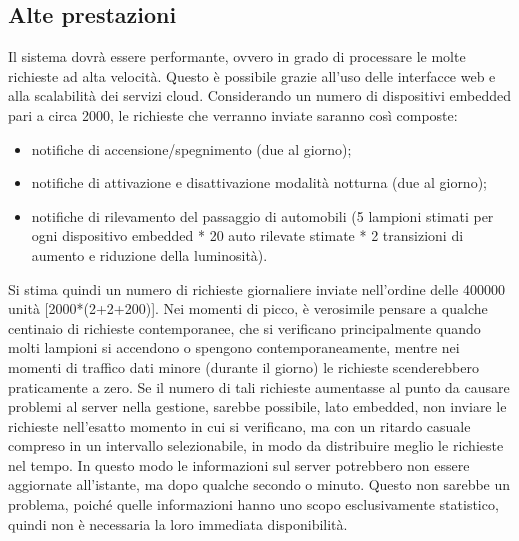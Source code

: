 \subsection{Alte prestazioni}
Il sistema dovrà essere performante, ovvero in grado di processare le molte richieste ad alta velocità. Questo è possibile grazie all'uso delle interfacce web e alla scalabilità dei servizi cloud. Considerando un numero di dispositivi embedded pari a circa 2000, le richieste che verranno inviate saranno così composte:
\begin{itemize}
 \item notifiche di accensione/spegnimento (due al giorno);
 \item notifiche di attivazione e disattivazione modalità notturna (due al giorno);
 \item notifiche di rilevamento del passaggio di automobili (5 lampioni stimati per ogni dispositivo embedded * 20 auto rilevate stimate * 2 transizioni di aumento e riduzione della luminosità).
\end{itemize}
Si stima quindi un numero di richieste giornaliere inviate nell'ordine delle 400000 unità [2000*(2+2+200)].
Nei momenti di picco, è verosimile pensare a qualche centinaio di richieste contemporanee, che si verificano principalmente quando molti lampioni si accendono o spengono contemporaneamente, mentre nei momenti di traffico dati minore (durante il giorno) le richieste scenderebbero praticamente a zero. Se il numero di tali richieste aumentasse al punto da causare problemi al server nella gestione, sarebbe possibile, lato embedded, non inviare le richieste nell'esatto momento in cui si verificano, ma con un ritardo casuale compreso in un intervallo selezionabile, in modo da distribuire meglio le richieste nel tempo. In questo modo le informazioni sul server potrebbero non essere aggiornate all’istante, ma dopo qualche secondo o minuto. Questo non sarebbe un problema, poiché quelle informazioni hanno uno scopo esclusivamente statistico, quindi non è necessaria la loro immediata disponibilità.
